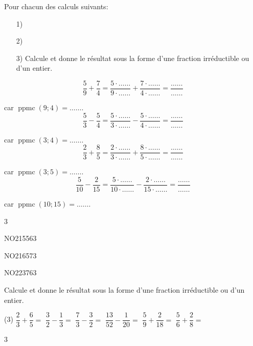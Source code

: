 \documentclass[a4paper,11pt]{report}
\begin{document}
\begin{exop}
{Pour chacun des calculs suivants:
	\begin{enumerate}
    \item[1)] 
    \item[2)] 
    \item[3)] {\text Calcule et donne le résultat sous la forme d'une fraction irréductible ou \\
    d'un entier.}
\end{enumerate}
\vspace{3pt}

\begin{tasks}
	\task \[\dfrac{5}{9}+\dfrac{7}{4}=\dfrac{5\cdot\ldots\ldots}{9\cdot\ldots\ldots}+\dfrac{7\cdot \ldots\ldots}{4\cdot \ldots\ldots}=\dfrac{\ldots\ldots}{\ldots\ldots}\]
		\vspace{3pt}

	car $\operatorname{ppmc}(9;4)=\ldots\ldots$.
	\task \[\dfrac{5}{3}-\dfrac{5}{4}=\dfrac{5\cdot\ldots\ldots}{3\cdot\ldots\ldots}-\dfrac{5\cdot \ldots\ldots}{4\cdot \ldots\ldots}=\dfrac{\ldots\ldots}{\ldots\ldots}\]
		\vspace{3pt}

	car $\operatorname{ppmc}(3;4)=\ldots\ldots$.
	\task \[\dfrac{2}{3}+\dfrac{8}{5}=\dfrac{2\cdot\ldots\ldots}{3\cdot\ldots\ldots}+\dfrac{8\cdot \ldots\ldots}{5\cdot \ldots\ldots}=\dfrac{\ldots\ldots}{\ldots\ldots}\]
		\vspace{3pt}

	car $\operatorname{ppmc}(3;5)=\ldots\ldots$.
	\task \[\dfrac{5}{10}-\dfrac{2}{15}=\dfrac{5\cdot\ldots\ldots}{10\cdot\ldots\ldots}-\dfrac{2\cdot \ldots\ldots}{15\cdot \ldots\ldots}=\dfrac{\ldots\ldots}{\ldots\ldots}\]
		\vspace{3pt}

	car $\operatorname{ppmc}(10;15)=\ldots\ldots$.
\end{tasks}}
{3}
\end{exop}
\begin{exol}{NO215}{56}{3}
\end{exol}
\begin{exol}{NO216}{57}{3}
\end{exol}
\begin{exof}{NO223}{76}{3}
\end{exof}


\begin{exo}
{Calcule et donne le résultat sous la forme d'une fraction irréductible ou d'un entier.
\begin{tasks}(3)
\task $\dfrac{2}{3}+\dfrac{6}{5}=$
\task $\dfrac{3}{2}-\dfrac{1}{3}=$
\task $\dfrac{7}{3}-\dfrac{3}{2}=$
\task $\dfrac{13}{52}-\dfrac{1}{20}=$
\task $\dfrac{5}{9}+\dfrac{2}{18}=$
\task $\dfrac{5}{6}+\dfrac{2}{8}=$
\end{tasks}    
}{3}
\end{exo}
\end{document}
